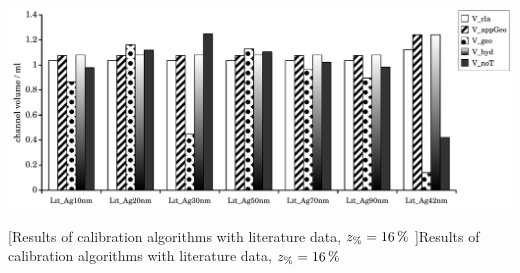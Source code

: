 \begin{minipage}{\linewidth}
\begin{minipage}{.75\linewidth}
  \end{minipage}\\
  \begin{minipage}{.75\linewidth}
    \includegraphics[width=\linewidth]{./images/data/eval_lit_p16/Lit2Data_V_16p.pdf}
  \end{minipage}
  [Results of calibration algorithms with literature data, $z_\text{\%} = \SI{16}{\percent}$
  ]{Results of calibration algorithms with literature data, $z_\text{\%} = \SI{16}{\percent}$}
  \label{fig:LitDataResults_p16}
\end{minipage}
{}
